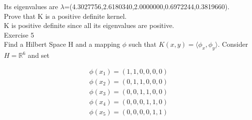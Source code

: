 \documentclass[18pt]{article}
\begin{document}
\vspace{.5cm}
\begin{flushleft}
Its eigenvalues are $\lambda $=(4.3027756,2.6180340,2.0000000,0.6972244,0.3819660).\\
\vspace{.5cm}
Prove that K is a positive definite kernel.\\
\vspace{.5cm}
K is positive definite since all its eigenvalues are positive.\\
\vspace{.5cm}
Exercise 5\\
Find a Hilbert Space H and a mapping $\phi$ such that $K(x,y)=\langle \phi_x,\phi_y \rangle $.
Consider $H=\mathbb{R}^6$ and set
\end{flushleft}

$$
\begin{aligned}
&\phi(x_1) = \left(1, 1, 0, 0, 0, 0\right) \\
&\phi(x_2) = \left(0, 1, 1, 0, 0, 0\right) \\
&\phi(x_3) = \left(0, 0, 1, 1, 0, 0\right) \\
&\phi(x_4) = \left(0, 0, 0, 1, 1, 0\right) \\
&\phi(x_5) = \left(0, 0, 0, 0, 1, 1\right) \\
\end{aligned}
$$
\end{document}
